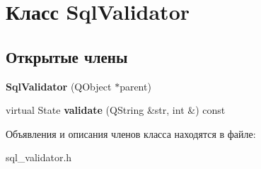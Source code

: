 \hypertarget{class_sql_validator}{\section{Класс \-Sql\-Validator}
\label{class_sql_validator}
}
\subsection*{Открытые члены}
\begin{DoxyCompactItemize}
\item 
\hypertarget{class_sql_validator_afdc45ef477fcb8455ec6f65d9da25e75}{{\bfseries \-Sql\-Validator} (\-Q\-Object $\ast$parent)}\label{class_sql_validator_afdc45ef477fcb8455ec6f65d9da25e75}

\item 
\hypertarget{class_sql_validator_a584ff45d7f9bfe11d8b7aa5ebc5bfdc5}{virtual \-State {\bfseries validate} (\-Q\-String \&str, int \&) const }\label{class_sql_validator_a584ff45d7f9bfe11d8b7aa5ebc5bfdc5}

\end{DoxyCompactItemize}


Объявления и описания членов класса находятся в файле\-:\begin{DoxyCompactItemize}
\item 
sql\-\_\-validator.\-h\end{DoxyCompactItemize}
